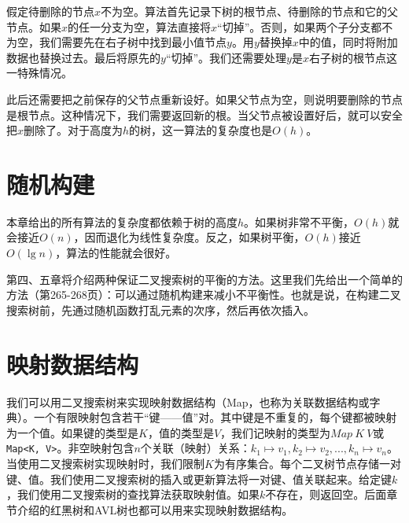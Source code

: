 \documentclass[b5paper]{ctexart}
\begin{document}
假定待删除的节点$x$不为空。算法首先记录下树的根节点、待删除的节点和它的父节点。如果$x$的任一分支为空，算法直接将$x$“切掉”。否则，如果两个子分支都不为空，我们需要先在右子树中找到最小值节点$y$。用$y$替换掉$x$中的值，同时将附加数据也替换过去。最后将原先的$y$“切掉”。我们还需要处理$y$是$x$右子树的根节点这一特殊情况。

此后还需要把之前保存的父节点重新设好。如果父节点为空，则说明要删除的节点是根节点。这种情况下，我们需要返回新的根。当父节点被设置好后，就可以安全把$x$删除了。对于高度为$h$的树，这一算法的复杂度也是$O(h)$。

\begin{Exercise}
\end{Exercise}

\section{随机构建}

本章给出的所有算法的复杂度都依赖于树的高度$h$。如果树非常不平衡，$O(h)$就会接近$O(n)$，因而退化为线性复杂度。反之，如果树平衡，$O(h)$接近$O(\lg n)$，算法的性能就会很好。

第四、五章将介绍两种保证二叉搜索树的平衡的方法。这里我们先给出一个简单的方法（\cite{CLRS}第265-268页）：可以通过随机构建来减小不平衡性。也就是说，在构建二叉搜索树前，先通过随机函数打乱元素的次序，然后再依次插入。

\begin{Exercise}
\end{Exercise}

\section{映射数据结构}
我们可以用二叉搜索树来实现映射数据结构（Map，也称为关联数据结构或字典）。一个有限映射包含若干“键——值”对。其中键是不重复的，每个键都被映射为一个值。如果键的类型是$K$，值的类型是$V$，我们记映射的类型为$Map\ K\ V$或\texttt{Map<K, V>}。非空映射包含$n$个关联（映射）关系：$k_1 \mapsto v_1, k_2 \mapsto v_2, ..., k_n \mapsto v_n$。当使用二叉搜索树实现映射时，我们限制$K$为有序集合。每个二叉树节点存储一对键、值。我们使用二叉搜索树的插入或更新算法将一对键、值关联起来。给定键$k$，我们使用二叉搜索树的查找算法获取映射值。如果$k$不存在，则返回空。后面章节介绍的红黑树和AVL树也都可以用来实现映射数据结构。
\end{document}
